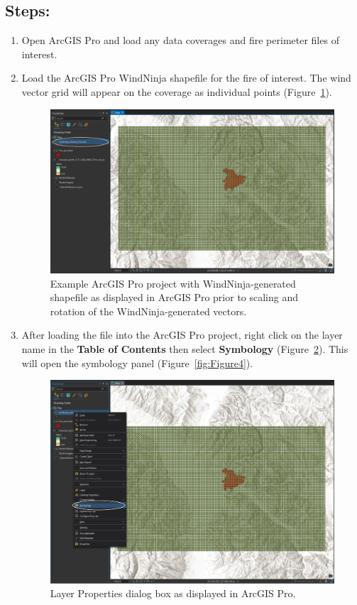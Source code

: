 \documentclass[12pt]{article}
\begin{document}
\subsection*{Steps:}
\begin{enumerate}
\item Open ArcGIS Pro and load any data coverages and fire perimeter files of interest.
\item Load the ArcGIS Pro WindNinja shapefile for the fire of interest. The wind vector grid will appear on the
coverage as individual points (Figure~\ref{fig:Figure2}).

\begin{figure}[H]
	\centering
	\includegraphics[scale=0.3]{arc_2.png}
	\caption{Example ArcGIS Pro project with WindNinja-generated shapefile as displayed in ArcGIS Pro prior to scaling and rotation of the
WindNinja-generated vectors.}
\label{fig:Figure2}
\end{figure}

\item After loading the file into the ArcGIS Pro project, right click on the layer name in the  \textbf{Table of Contents} then select \textbf{Symbology} (Figure~\ref{fig:Figure3}). This will open the symbology panel (Figure~\ref{fig:Figure4}). 

\begin{figure}[H]
	\centering
	\includegraphics[scale=0.3]{arc_3.png}
	\caption{Layer Properties dialog box as displayed in ArcGIS Pro.}
\label{fig:Figure3}
\end{figure}


\end{enumerate}
\end{document}
